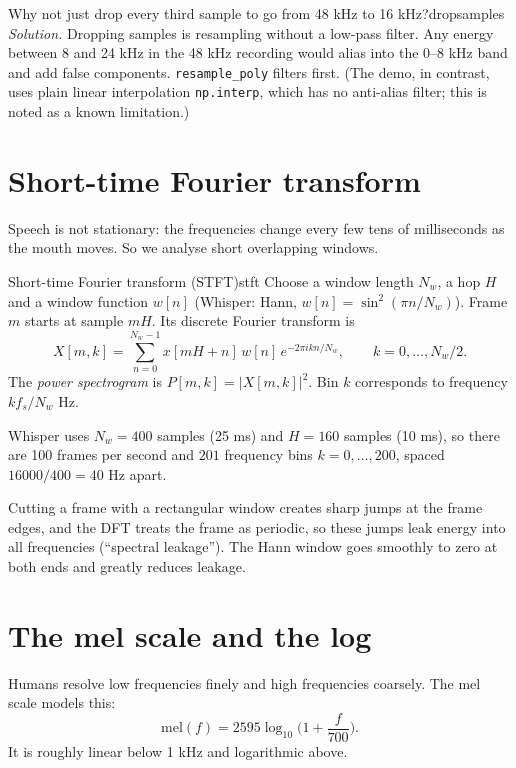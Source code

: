 \begin{exercise}{Why not just drop every third sample to go from 48 kHz to 16 kHz?}{dropsamples}
\textit{Solution.} Dropping samples is resampling without a low-pass filter. Any energy between 8 and 24 kHz in the 48 kHz recording
would alias into the 0--8 kHz band and add false components. \texttt{resample\_poly} filters first. (The demo, in contrast, uses
plain linear interpolation \texttt{np.interp}, which has no anti-alias filter; this is noted as a known limitation.)
\end{exercise}

\section{Short-time Fourier transform}

Speech is not stationary: the frequencies change every few tens of milliseconds as the mouth moves. So we analyse short
overlapping windows.

\begin{definition}{Short-time Fourier transform (STFT)}{stft}
Choose a window length $N_w$, a hop $H$ and a window function $w[n]$ (Whisper: Hann, $w[n]=\sin^2(\pi n/N_w)$). Frame $m$ starts at
sample $mH$. Its discrete Fourier transform is
\[
X[m,k]=\sum_{n=0}^{N_w-1} x[mH+n]\,w[n]\,e^{-2\pi i kn/N_w},\qquad k=0,\dots,N_w/2 .
\]
The \emph{power spectrogram} is $P[m,k]=|X[m,k]|^2$. Bin $k$ corresponds to frequency $k f_s/N_w$ Hz.
\end{definition}

Whisper uses $N_w=400$ samples (25 ms) and $H=160$ samples (10 ms), so there are 100 frames per second and $201$ frequency bins
$k=0,\dots,200$, spaced $16000/400=40$ Hz apart.

\begin{intuition}
Cutting a frame with a rectangular window creates sharp jumps at the frame edges, and the DFT treats the frame as periodic, so these
jumps leak energy into all frequencies (``spectral leakage''). The Hann window goes smoothly to zero at both ends and greatly
reduces leakage.
\end{intuition}

\section{The mel scale and the log}

Humans resolve low frequencies finely and high frequencies coarsely. The mel scale models this:
\[
\mathrm{mel}(f)=2595\log_{10}\!\Big(1+\frac{f}{700}\Big).
\]
It is roughly linear below 1 kHz and logarithmic above.

